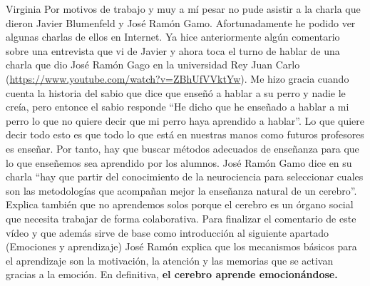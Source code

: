 \begin{opin}{\virgicolor}{Virginia}
Por motivos de trabajo y muy a mí pesar no pude asistir a la charla que dieron Javier Blumenfeld y José Ramón Gamo. 
%
Afortunadamente he podido ver algunas charlas de ellos en Internet. 
%
Ya hice anteriormente algún comentario sobre una entrevista que vi de Javier y ahora toca el turno de hablar de una charla que dio José Ramón Gago en la universidad Rey Juan Carlo (\url{https://www.youtube.com/watch?v=ZBhUfVVktYw}). 
%
Me hizo gracia cuando cuenta la historia del sabio que dice que enseñó a hablar a su perro y nadie le creía, pero entonce el sabio responde “He dicho que he enseñado a hablar a mi perro lo que no quiere decir que mi perro haya aprendido a hablar”. 
%
Lo que quiere decir todo esto es que todo lo que está en nuestras manos como futuros profesores es enseñar. 
%
Por tanto, hay que buscar métodos adecuados de enseñanza para que lo que enseñemos sea aprendido por los alumnos. 
%
José Ramón Gamo dice en su charla “hay que partir del conocimiento de la neurociencia para seleccionar cuales son las metodologías que acompañan mejor la enseñanza natural de un cerebro”. 
%
Explica también que no aprendemos solos porque el cerebro es un órgano social que necesita trabajar de forma colaborativa. 
%
Para finalizar el comentario de este vídeo y que además sirve de base como introducción al siguiente apartado (Emociones y aprendizaje) José Ramón explica que los mecanismos básicos para el aprendizaje son la motivación, la atención y las memorias que se activan gracias a la emoción. 
%
En definitiva, \textbf{el cerebro aprende emocionándose. }

\end{opin}
